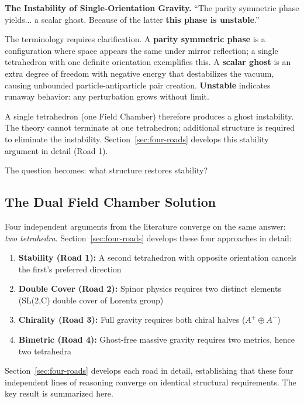 \documentclass[aps,prd,preprint,superscriptaddress,showpacs,preprintnumbers,amsmath,amssymb,nofootinbib]{revtex4-2}
\begin{document}
\textbf{The Instability of Single-Orientation Gravity.} ``The parity symmetric phase yields... a scalar ghost. Because of the latter \textbf{this phase is unstable}.''~\cite{alexander2014}

The terminology requires clarification. A \textbf{parity symmetric phase} is a configuration where space appears the same under mirror reflection; a single tetrahedron with one definite orientation exemplifies this. A \textbf{scalar ghost} is an extra degree of freedom with negative energy that destabilizes the vacuum, causing unbounded particle-antiparticle pair creation. \textbf{Unstable} indicates runaway behavior: any perturbation grows without limit.

A single tetrahedron (one Field Chamber) therefore produces a ghost instability. The theory cannot terminate at one tetrahedron; additional structure is required to eliminate the instability. Section~\ref{sec:four-roads} develops this stability argument in detail (Road 1).

The question becomes: what structure restores stability?

\subsection{The Dual Field Chamber Solution}
\label{subsec:dual-chamber}

Four independent arguments from the literature converge on the same answer: \emph{two tetrahedra}. Section~\ref{sec:four-roads} develops these four approaches in detail:

\begin{enumerate}
\item \textbf{Stability (Road 1):} A second tetrahedron with opposite orientation cancels the first's preferred direction~\cite{alexander2014}
\item \textbf{Double Cover (Road 2):} Spinor physics requires two distinct elements (SL(2,C) double cover of Lorentz group)~\cite{weinberg1995,geroch1968}
\item \textbf{Chirality (Road 3):} Full gravity requires both chiral halves ($A^+ \oplus A^-$)~\cite{ashtekar1986}
\item \textbf{Bimetric (Road 4):} Ghost-free massive gravity requires two metrics, hence two tetrahedra~\cite{hassan2012,boulware1972}
\end{enumerate}

Section~\ref{sec:four-roads} develops each road in detail, establishing that these four independent lines of reasoning converge on identical structural requirements. The key result is summarized here.
\end{document}
